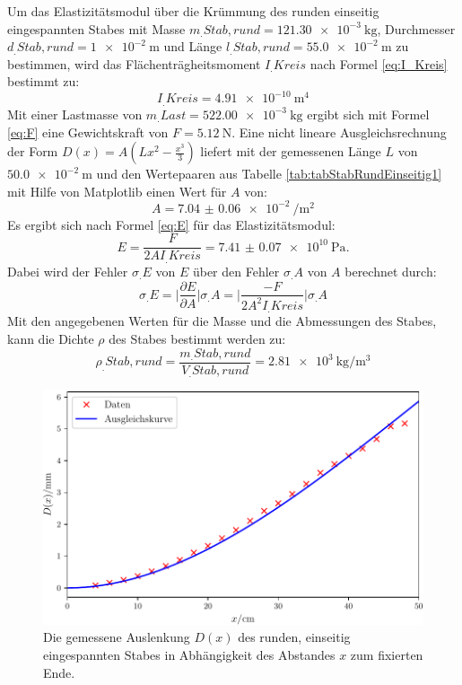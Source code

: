 Um das Elastizitätsmodul über die Krümmung des runden einseitig eingespannten Stabes mit Masse $m_.{Stab,rund} = \SI{121,30e-3}{\kilogram}$, Durchmesser $d_.{Stab,rund} = \SI{1e-2}{\metre}$ und Länge $l_.{Stab,rund}=\SI{55,0e-2}{\metre}$ zu bestimmen, wird das Flächenträgheitsmoment $I_.{Kreis}$ nach Formel \eqref{eq:I_Kreis} bestimmt zu:
\[
	I_.{Kreis}=\SI{4.91e-10}{\metre\tothe{4}}
\]
Mit einer Lastmasse von $m_.{Last} = \SI{522,00e-3}{\kilogram}$ ergibt sich mit Formel \eqref{eq:F} eine Gewichtskraft von $F=\SI{5.12}{\newton}$. Eine nicht lineare Ausgleichsrechnung der Form $D(x) = A ( L x^2 - \frac{x^3}{3})$ liefert mit der gemessenen Länge $L$ von $\SI{50.0e-2}{\metre}$ und den Wertepaaren aus Tabelle \ref{tab:tabStabRundEinseitig1} mit Hilfe von Matplotlib \cite{matplotlib} einen Wert für $A$ von:
\[
	A = \SI{7.04(6)e-2}{\per\metre\squared}
\]
Es ergibt sich nach Formel \eqref{eq:E} für das Elastizitätsmodul:
\[
	E = \frac{F}{2AI_.{Kreis}} = \SI{7.41(7)e10}{\pascal}\text{.}
\]
Dabei wird der Fehler $\sigma_.E$ von $E$ über den Fehler $\sigma_.A$ von $A$ berechnet durch:
\begin{equation}
	\sigma_.E = \biggl|\frac{\partial E}{\partial A}\biggl|\sigma_.A = \biggl|\frac{-F}{2A^2I_.{Kreis}}\biggl|\sigma_.A \label{eq:sigma_E}
\end{equation}
Mit den angegebenen Werten für die Masse und die Abmessungen des Stabes, kann die Dichte $\rho$ des Stabes bestimmt werden zu:
\[
	\rho_.{Stab,rund} = \frac{m_.{Stab,rund}}{V_.{Stab,rund}}=\SI{2,81e3}{\kilogram\per\cubic\metre}
\]
\begin{figure}
	\centering
	\includegraphics[scale=.8]{content/images/StabRundEinseitig1.pdf}
	\caption{Die gemessene Auslenkung $D(x)$ des runden, einseitig eingespannten Stabes in Abhängigkeit des Abstandes $x$ zum fixierten Ende.}
	\label{fig:rund}
\end{figure}
